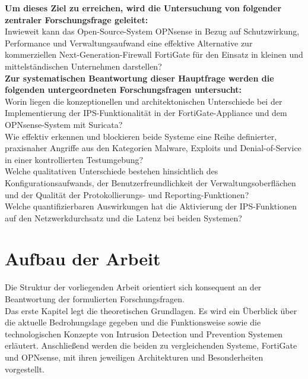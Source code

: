 \textbf{Um dieses Ziel zu erreichen, wird die Untersuchung von folgender zentraler Forschungsfrage geleitet:}\\

Inwieweit kann das Open-Source-System OPNsense in Bezug auf Schutzwirkung, Performance und Verwaltungsaufwand eine effektive Alternative zur kommerziellen Next-Generation-Firewall FortiGate für den Einsatz in kleinen und mittelständischen Unternehmen darstellen?\\

\textbf{Zur systematischen Beantwortung dieser Hauptfrage werden die folgenden untergeordneten Forschungsfragen untersucht:}\\

Worin liegen die konzeptionellen und architektonischen Unterschiede bei der Implementierung der IPS-Funktionalität in der FortiGate-Appliance und dem OPNsense-System mit Suricata?\\

Wie effektiv erkennen und blockieren beide Systeme eine Reihe definierter, praxisnaher Angriffe aus den Kategorien Malware, Exploits und Denial-of-Service in einer kontrollierten Testumgebung?\\

Welche qualitativen Unterschiede bestehen hinsichtlich des Konfigurationsaufwands, der Benutzerfreundlichkeit der Verwaltungsoberflächen und der Qualität der Protokollierungs- und Reporting-Funktionen?\\

Welche quantifizierbaren Auswirkungen hat die Aktivierung der IPS-Funktionen auf den Netzwerkdurchsatz und die Latenz bei beiden Systemen?

\section{Aufbau der Arbeit}

Die Struktur der vorliegenden Arbeit orientiert sich konsequent an der Beantwortung der formulierten Forschungsfragen.\\

Das erste Kapitel legt die theoretischen Grundlagen. Es wird ein Überblick über die aktuelle Bedrohungslage gegeben und die Funktionsweise sowie die technologischen Konzepte von Intrusion Detection und Prevention Systemen erläutert. Anschließend werden die beiden zu vergleichenden Systeme, FortiGate und OPNsense, mit ihren jeweiligen Architekturen und Besonderheiten vorgestellt.\\

